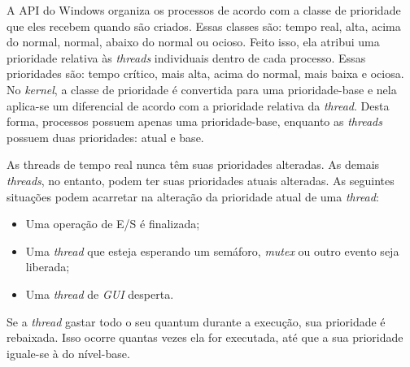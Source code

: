 A API do Windows organiza os processos de acordo com a classe de prioridade que eles recebem quando são criados. Essas classes são: tempo real, alta, acima do normal, normal, abaixo do normal ou ocioso. Feito isso, ela atribui uma prioridade relativa às \emph{threads} individuais dentro de cada processo. Essas prioridades são: tempo crítico, mais alta, acima do normal, mais baixa e ociosa. No \emph{kernel}, a classe de prioridade é convertida para uma prioridade-base e nela aplica-se um diferencial de acordo com a prioridade relativa da \emph{thread}. Desta forma, processos possuem apenas uma prioridade-base, enquanto as \emph{threads} possuem duas prioridades: atual e base. 

As threads de tempo real nunca têm suas prioridades alteradas. As demais \emph{threads}, no entanto, podem ter suas prioridades atuais alteradas. As seguintes situações podem acarretar na alteração da prioridade atual de uma \emph{thread}:
\begin{itemize}
	\item Uma operação de E/S é finalizada;
	\item Uma \emph{thread} que esteja esperando um semáforo, \emph{mutex} ou outro evento seja liberada;
	\item Uma \emph{thread} de \emph{GUI} desperta.
\end{itemize}

Se a \emph{thread} gastar todo o seu quantum durante a execução, sua prioridade é rebaixada. Isso ocorre quantas vezes ela for executada, até que a sua prioridade iguale-se à do nível-base.
